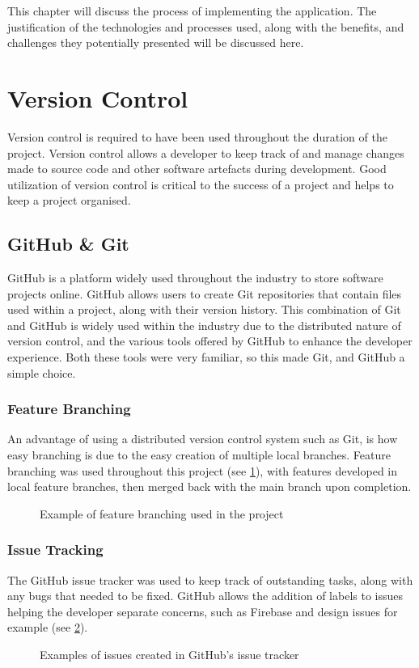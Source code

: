 This chapter will discuss the process of implementing the application. The justification of the technologies and processes used, along with the benefits, and challenges they potentially presented will be discussed here.

\section{Version Control}
Version control is required to have been used throughout the duration of the project. Version control allows a developer to keep track of and manage changes made to source code and other software artefacts during development. Good utilization of version control is critical to the success of a project and helps to keep a project organised.
\subsection{GitHub \& Git}
GitHub \cite{github} is a platform widely used throughout the industry to store software projects online. GitHub allows users to create Git repositories \cite{git} that contain files used within a project, along with their version history. This combination of Git and GitHub is widely used within the industry due to the distributed nature of version control, and the various tools offered by GitHub to enhance the developer experience. Both these tools were very familiar, so this made Git, and GitHub a simple choice. 
\subsubsection{Feature Branching}
An advantage of using a distributed version control system such as Git, is how easy branching is due to the easy creation of multiple local branches. Feature branching was used throughout this project (see \ref{fig:branching}), with features developed in local feature branches, then merged back with the main branch upon completion.  
\begin{figure}[!htbp]
    \centering
    \begin{subfigure}[b]{0.90\textwidth}
    \end{subfigure}
    \caption{Example of feature branching used in the project}
    \label{fig:branching}
\end{figure}
\subsubsection{Issue Tracking}
The GitHub issue tracker was used to keep track of outstanding tasks, along with any bugs that needed to be fixed. GitHub allows the addition of labels to issues helping the developer separate concerns, such as Firebase and design issues for example (see \ref{fig:issues}).
\begin{figure}[!htbp]
    \centering
    \begin{subfigure}[b]{0.90\textwidth}
    \end{subfigure}
    \caption{Examples of issues created in GitHub's issue tracker}
    \label{fig:issues}
\end{figure}
